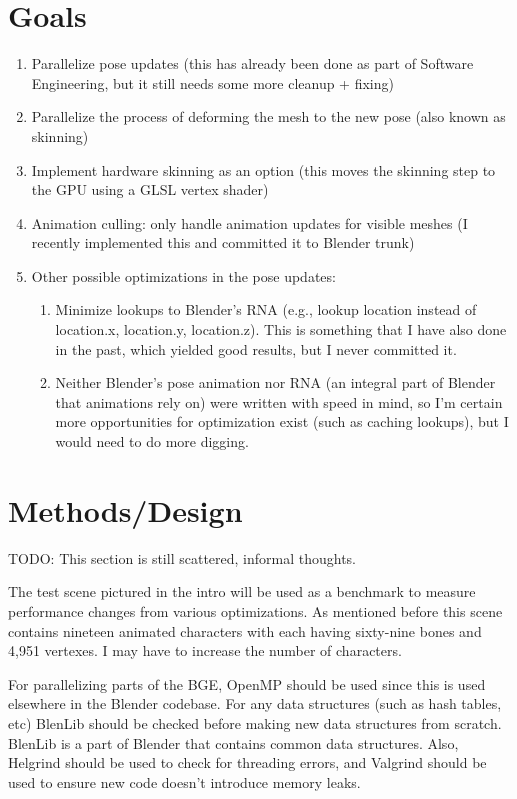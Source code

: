 \documentclass[10pt]{article}
\newcommand{\todo}[1] {{\color{todo} TODO: #1}}
\begin{document}
\section{Goals}
\begin{enumerate}
 \item Parallelize pose updates (this has already been done as part of Software Engineering, but it still needs some more cleanup + fixing)
 \item Parallelize the process of deforming the mesh to the new pose (also known as skinning)
 \item Implement hardware skinning as an option (this moves the skinning step to the GPU using a GLSL vertex shader)
 \item Animation culling: only handle animation updates for visible meshes (I recently implemented this and committed it to Blender trunk)
 \item Other possible optimizations in the pose updates:
    \begin{enumerate}
      \item Minimize lookups to Blender's RNA (e.g., lookup location instead of location.x, location.y, location.z). This is something that I have also done in the past, which yielded good results, but I never committed it.
      \item Neither Blender's pose animation nor RNA (an integral part of Blender that animations rely on) were written with speed in mind, so I'm certain more opportunities for optimization exist (such as caching lookups), but I would need to do more digging.
    \end{enumerate}
\end{enumerate}

\section{Methods/Design}
\todo{This section is still scattered, informal thoughts.}

The test scene pictured in the intro will be used as a benchmark to measure performance changes from various optimizations. As mentioned before this scene contains nineteen animated characters with each having sixty-nine bones and 4,951 vertexes. I may have to increase the number of characters.

For parallelizing parts of the BGE, OpenMP should be used since this is used elsewhere in the Blender codebase. For any data structures (such as hash tables, etc) BlenLib should be checked before making new data structures from scratch. BlenLib is a part of Blender that contains common data structures. Also, Helgrind should be used to check for threading errors, and Valgrind should be used to ensure new code doesn't introduce memory leaks.
\end{document}
